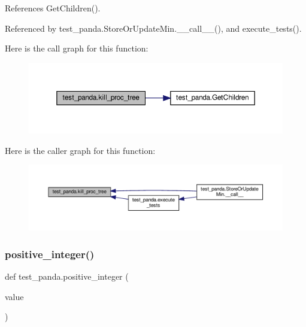 References Get\+Children().



Referenced by test\+\_\+panda.\+Store\+Or\+Update\+Min.\+\_\+\+\_\+call\+\_\+\+\_\+(), and execute\+\_\+tests().

Here is the call graph for this function\+:
\nopagebreak
\begin{figure}[H]
\begin{center}
\leavevmode
\includegraphics[width=350pt]{d0/dee/namespacetest__panda_adecb03888c930482a0044c4db02e9449_cgraph}
\end{center}
\end{figure}
Here is the caller graph for this function\+:
\nopagebreak
\begin{figure}[H]
\begin{center}
\leavevmode
\includegraphics[width=350pt]{d0/dee/namespacetest__panda_adecb03888c930482a0044c4db02e9449_icgraph}
\end{center}
\end{figure}
\mbox{\label{namespacetest__panda_a377e0cbd24df5a116b96365f6e224241}} 
\subsubsection{\texorpdfstring{positive\+\_\+integer()}{positive\_integer()}}
{\footnotesize\ttfamily def test\+\_\+panda.\+positive\+\_\+integer (\begin{DoxyParamCaption}\item[{}]{value }\end{DoxyParamCaption})}



